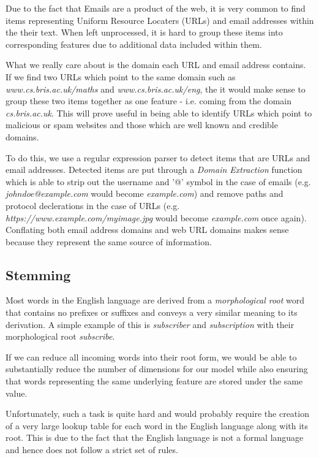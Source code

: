 Due to the fact that Emails are a product of the web, it is very common to find items representing Uniform Resource Locaters (URLs) and email addresses within the their text. When left unprocessed, it is hard to group these items into corresponding features due to additional data included within them.

What we really care about is the domain each URL and email address contains. If we find two URLs which point to the same domain such as {\it www.cs.bris.ac.uk/maths} and {\it www.cs.bris.ac.uk/eng}, the it would make sense to group these two items together as one feature - i.e. coming from the domain {\it cs.bris.ac.uk}. This will prove useful in being able to identify URLs which point to malicious or spam websites and those which are well known and credible domains.

To do this, we use a regular expression parser to detect items that are URLs and email addresses. Detected items are put through a {\it Domain Extraction} function which is able to strip out the username and '@' symbol in the case of emails (e.g. {\it johndoe@example.com} would become {\it example.com}) and remove paths and protocol declerations in the case of URLs (e.g. {\it https://www.example.com/myimage.jpg} would become {\it example.com} once again). Conflating both email address domains and web URL domains makes sense because they represent the same source of information.


\subsection{Stemming}
Most words in the English language are derived from a {\it morphological root} word that contains no prefixes or suffixes and conveys a very similar meaning to its derivation. A simple example of this is {\it subscriber} and {\it subscription} with their morphological root {\it subscribe}. 

If we can reduce all incoming words into their root form, we would be able to substantially reduce the number of dimensions for our model while also ensuring that words representing the same underlying feature are stored under the same value.

Unfortunately, such a task is quite hard and would probably require the creation of a very large lookup table for each word in the English language along with its root. This is due to the fact that the English language is not a formal language and hence does not follow a strict set of rules. 

